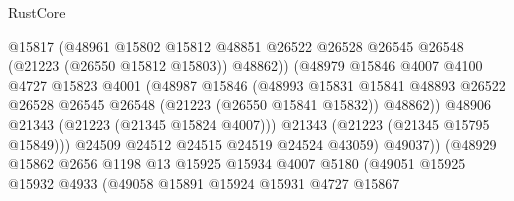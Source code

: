 \begin{lexlean}{RustCore}
\begin{coremodule}
                                    @15817
                                    (@48961
                                      @15802
                                      @15812
                                      @48851
                                      @26522
                                      @26528
                                      @26545
                                      @26548
                                      (@21223 (@26550 @15812 @15803))
                                      @48862))
                                  (@48979
                                    @15846
                                    @4007
                                    @4100
                                    @4727
                                    @15823
                                    @4001
                                    (@48987
                                      @15846
                                      (@48993
                                        @15831
                                        @15841
                                        @48893
                                        @26522
                                        @26528
                                        @26545
                                        @26548
                                        (@21223 (@26550 @15841 @15832))
                                        @48862))
                                    @48906
                                    @21343
                                    (@21223 (@21345 @15824 @4007)))
                                  @21343
                                  (@21223 (@21345 @15795 @15849)))
                                @24509
                                @24512
                                @24515
                                @24519
                                @24524
                                @43059)
                              @49037))
                          (@48929
                            @15862
                            @2656
                            @1198
                            @13
                            @15925
                            @15934
                            @4007
                            @5180
                            (@49051
                              @15925
                              @15932
                              @4933
                              (@49058
                                @15891
                                @15924
                                @15931
                                @4727
                                @15867

\end{coremodule}
\end{lexlean}
